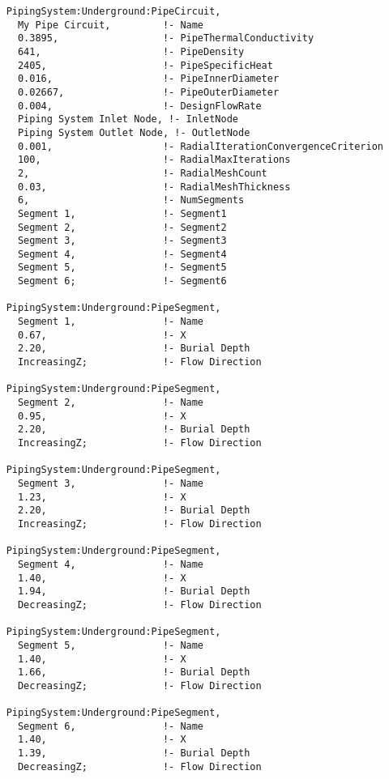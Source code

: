 \begin{lstlisting}
    PipingSystem:Underground:PipeCircuit,
      My Pipe Circuit,         !- Name
      0.3895,                  !- PipeThermalConductivity
      641,                     !- PipeDensity
      2405,                    !- PipeSpecificHeat
      0.016,                   !- PipeInnerDiameter
      0.02667,                 !- PipeOuterDiameter
      0.004,                   !- DesignFlowRate
      Piping System Inlet Node, !- InletNode
      Piping System Outlet Node, !- OutletNode
      0.001,                   !- RadialIterationConvergenceCriterion
      100,                     !- RadialMaxIterations
      2,                       !- RadialMeshCount
      0.03,                    !- RadialMeshThickness
      6,                       !- NumSegments
      Segment 1,               !- Segment1
      Segment 2,               !- Segment2
      Segment 3,               !- Segment3
      Segment 4,               !- Segment4
      Segment 5,               !- Segment5
      Segment 6;               !- Segment6

    PipingSystem:Underground:PipeSegment,
      Segment 1,               !- Name
      0.67,                    !- X
      2.20,                    !- Burial Depth
      IncreasingZ;             !- Flow Direction

    PipingSystem:Underground:PipeSegment,
      Segment 2,               !- Name
      0.95,                    !- X
      2.20,                    !- Burial Depth
      IncreasingZ;             !- Flow Direction

    PipingSystem:Underground:PipeSegment,
      Segment 3,               !- Name
      1.23,                    !- X
      2.20,                    !- Burial Depth
      IncreasingZ;             !- Flow Direction

    PipingSystem:Underground:PipeSegment,
      Segment 4,               !- Name
      1.40,                    !- X
      1.94,                    !- Burial Depth
      DecreasingZ;             !- Flow Direction

    PipingSystem:Underground:PipeSegment,
      Segment 5,               !- Name
      1.40,                    !- X
      1.66,                    !- Burial Depth
      DecreasingZ;             !- Flow Direction

    PipingSystem:Underground:PipeSegment,
      Segment 6,               !- Name
      1.40,                    !- X
      1.39,                    !- Burial Depth
      DecreasingZ;             !- Flow Direction
\end{lstlisting}

